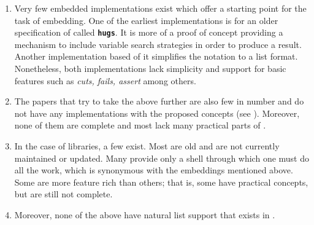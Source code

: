 \documentclass[thesis-solanki.tex]{subfiles}
\begin{document}
\begin{enumerate}
\item
  Very few embedded implementations exist which offer a starting point for the task of embedding.
  One of the earliest implementations \cite{website:mini-prolog-hugs98} is for an older specification of
   called  \texttt{\bfseries{hugs}}.
  It is more of a proof of concept providing a mechanism to include variable search strategies in order to produce
  a result.
  Another implementation \cite{website:takashi-workplace} based of it simplifies the notation to a list format.
  Nonetheless, both implementations lack simplicity and support for basic  features such as
  \textit{cuts, fails, assert} among others.

\begin{comment}
\item
  Only two embeddings exist, one of them is old and made for \texttt{\bfseries{hugs}} a functional programming
  system based on the \progLang{Haskell 98} specification.
  It is complex and also lacks a lot of \progLang{Prolog} like\eref{language-like} features including \textit{cuts, fails, assert}
  among others.
  The second one is based off the first one to make it simple but it loses the variable search strategy support
  which allows the programmer to choose the manner in which a solution is produced.
\end{comment}

\item
  The papers that try to take the above further are also few in number and do not have any implementations with the
  proposed concepts (see \cite{spivey1999embedding, seres1999algebra, seres2001algebra, spivey2000functional,
    seres2000optimisation}).
  Moreover, none of them are complete and most lack many practical parts of .

\item
  In the case of libraries, a few exist.
  Most are old and are not currently maintained or updated.
  Many provide only a shell through which one must do all the work, which is synonymous with
  the embeddings mentioned above.
  Some are more feature rich than others; that is, some have practical  concepts,
  but are still not complete.

\item
  Moreover, none of the above have natural list support that exists
  in .
\end{enumerate}
\end{document}
